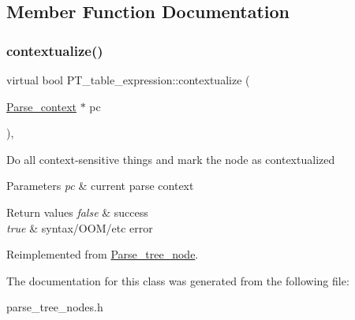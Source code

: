 \subsection{Member Function Documentation}
\mbox{\label{classPT__table__expression_a947974a68edf796f90266e545c080dd2}} 
\subsubsection{\texorpdfstring{contextualize()}{contextualize()}}
{\footnotesize\ttfamily virtual bool P\+T\+\_\+table\+\_\+expression\+::contextualize (\begin{DoxyParamCaption}\item[{\mbox{\hyperlink{structParse__context}{Parse\+\_\+context}} $\ast$}]{pc }\end{DoxyParamCaption})\hspace{0.3cm}{\ttfamily [inline]}, {\ttfamily [virtual]}}

Do all context-\/sensitive things and mark the node as contextualized


\begin{DoxyParams}{Parameters}
{\em pc} & current parse context\\
\hline
\end{DoxyParams}

\begin{DoxyRetVals}{Return values}
{\em false} & success \\
\hline
{\em true} & syntax/\+O\+O\+M/etc error \\
\hline
\end{DoxyRetVals}


Reimplemented from \mbox{\hyperlink{classParse__tree__node_a22d93524a537d0df652d7efa144f23da}{Parse\+\_\+tree\+\_\+node}}.



The documentation for this class was generated from the following file\+:\begin{DoxyCompactItemize}
\item 
parse\+\_\+tree\+\_\+nodes.\+h\end{DoxyCompactItemize}
